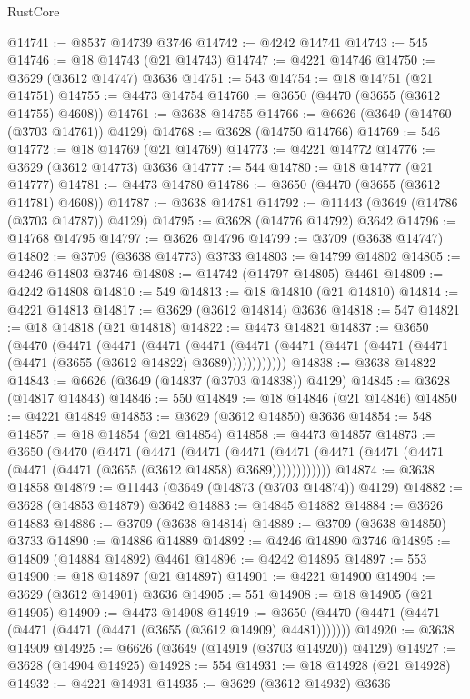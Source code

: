\begin{lexlean}{RustCore}
\begin{coremodule}
@14741 := @8537 @14739 @3746
@14742 := @4242 @14741
@14743 := 545
@14746 := @18 @14743 (@21 @14743)
@14747 := @4221 @14746
@14750 := @3629 (@3612 @14747) @3636
@14751 := 543
@14754 := @18 @14751 (@21 @14751)
@14755 := @4473 @14754
@14760 := @3650 (@4470 (@3655 (@3612 @14755) @4608))
@14761 := @3638 @14755
@14766 := @6626 (@3649 (@14760 (@3703 @14761)) @4129)
@14768 := @3628 (@14750 @14766)
@14769 := 546
@14772 := @18 @14769 (@21 @14769)
@14773 := @4221 @14772
@14776 := @3629 (@3612 @14773) @3636
@14777 := 544
@14780 := @18 @14777 (@21 @14777)
@14781 := @4473 @14780
@14786 := @3650 (@4470 (@3655 (@3612 @14781) @4608))
@14787 := @3638 @14781
@14792 := @11443 (@3649 (@14786 (@3703 @14787)) @4129)
@14795 := @3628 (@14776 @14792) @3642
@14796 := @14768 @14795
@14797 := @3626 @14796
@14799 := @3709 (@3638 @14747)
@14802 := @3709 (@3638 @14773) @3733
@14803 := @14799 @14802
@14805 := @4246 @14803 @3746
@14808 := @14742 (@14797 @14805) @4461
@14809 := @4242 @14808
@14810 := 549
@14813 := @18 @14810 (@21 @14810)
@14814 := @4221 @14813
@14817 := @3629 (@3612 @14814) @3636
@14818 := 547
@14821 := @18 @14818 (@21 @14818)
@14822 := @4473 @14821
@14837 := @3650
    (@4470
      (@4471
        (@4471
          (@4471
            (@4471 (@4471 (@4471 (@4471 (@4471 (@4471 (@4471 (@3655 (@3612 @14822) @3689))))))))))))
@14838 := @3638 @14822
@14843 := @6626 (@3649 (@14837 (@3703 @14838)) @4129)
@14845 := @3628 (@14817 @14843)
@14846 := 550
@14849 := @18 @14846 (@21 @14846)
@14850 := @4221 @14849
@14853 := @3629 (@3612 @14850) @3636
@14854 := 548
@14857 := @18 @14854 (@21 @14854)
@14858 := @4473 @14857
@14873 := @3650
    (@4470
      (@4471
        (@4471
          (@4471
            (@4471 (@4471 (@4471 (@4471 (@4471 (@4471 (@4471 (@3655 (@3612 @14858) @3689))))))))))))
@14874 := @3638 @14858
@14879 := @11443 (@3649 (@14873 (@3703 @14874)) @4129)
@14882 := @3628 (@14853 @14879) @3642
@14883 := @14845 @14882
@14884 := @3626 @14883
@14886 := @3709 (@3638 @14814)
@14889 := @3709 (@3638 @14850) @3733
@14890 := @14886 @14889
@14892 := @4246 @14890 @3746
@14895 := @14809 (@14884 @14892) @4461
@14896 := @4242 @14895
@14897 := 553
@14900 := @18 @14897 (@21 @14897)
@14901 := @4221 @14900
@14904 := @3629 (@3612 @14901) @3636
@14905 := 551
@14908 := @18 @14905 (@21 @14905)
@14909 := @4473 @14908
@14919 := @3650 (@4470 (@4471 (@4471 (@4471 (@4471 (@4471 (@3655 (@3612 @14909) @4481)))))))
@14920 := @3638 @14909
@14925 := @6626 (@3649 (@14919 (@3703 @14920)) @4129)
@14927 := @3628 (@14904 @14925)
@14928 := 554
@14931 := @18 @14928 (@21 @14928)
@14932 := @4221 @14931
@14935 := @3629 (@3612 @14932) @3636

\end{coremodule}
\end{lexlean}
